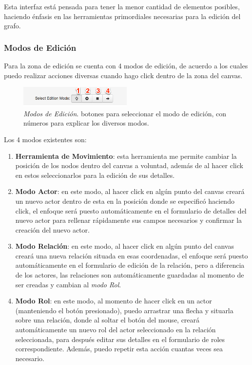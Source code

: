 Esta interfaz está pensada para tener la menor cantidad de elementos posibles, haciendo énfasis en las herramientas primordiales necesarias para la edición del grafo.

\subsubsection{Modos de Edición} %
\label{ssub:modos_de_edicion}

Para la zona de edición se cuenta con 4 modos de edición, de acuerdo a los cuales puedo realizar acciones diversas cuando hago click dentro de la zona del canvas.

\begin{figure}[H]
  \centering
  \includegraphics[width=0.5\textwidth]{images/modos_edicion.png}
  \caption[Modos de Edición]{\emph{Modos de Edición}. botones para seleccionar el modo de edición, con números para explicar los diversos modos.}
  \label{modos_edicion}
\end{figure}

Los 4 modos existentes son:

  \begin{enumerate}
    \item \textbf{Herramienta de Movimiento}: esta herramienta me permite cambiar la posición de los nodos dentro del canvas a voluntad, además de al hacer click en estos seleccionarlos para la edición de sus detalles.
    \item \textbf{Modo Actor}: en este modo, al hacer click en algún punto del canvas creará un nuevo actor dentro de esta en la posición donde se especificó haciendo click, el enfoque será puesto automáticamente en el formulario de detalles del nuevo actor para rellenar rápidamente sus campos necesarios y confirmar la creación del nuevo actor.
    \item \textbf{Modo Relación}: en este modo, al hacer click en algún punto del canvas creará una nueva relación situada en esas coordenadas, el enfoque será puesto automáticamente en el formulario de edición de la relación, pero a diferencia de los actores, las relaciones son automáticamente guardadas al momento de ser creadas y cambian al \emph{modo Rol}.
    \item \textbf{Modo Rol}: en este modo, al momento de hacer click en un actor (manteniendo el botón presionado), puedo arrastrar una flecha y situarla sobre una relación, donde al soltar el botón del mouse, creará automáticamente un nuevo rol del actor seleccionado en la relación seleccionada, para después editar sus detalles en el formulario de roles correspondiente. Además, puedo repetir esta acción cuantas veces sea necesario.
  \end{enumerate}

